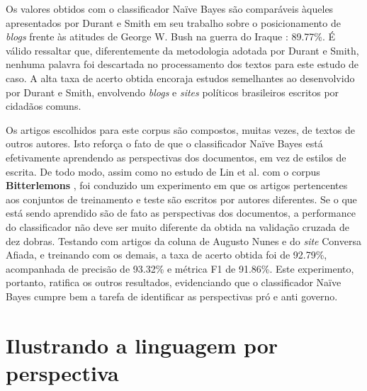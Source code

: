 
Os valores obtidos com o classificador Naïve Bayes são comparáveis àqueles apresentados por Durant e Smith em seu trabalho sobre o posicionamento de \emph{blogs} frente às atitudes de George W. Bush na guerra do Iraque \cite{durant-smith}: 89.77\%. É válido ressaltar que, diferentemente da metodologia adotada por Durant e Smith, nenhuma palavra foi descartada no processamento dos textos para este estudo de caso. A alta taxa de acerto obtida encoraja estudos semelhantes ao desenvolvido por Durant e Smith, envolvendo \emph{blogs} e \emph{sites} políticos brasileiros escritos por cidadãos comuns. %

Os artigos escolhidos para este corpus são compostos, muitas vezes, de textos de outros autores. Isto reforça o fato de que o classificador Naïve Bayes está efetivamente aprendendo as perspectivas dos documentos, em vez de estilos de escrita. De todo modo, assim como no estudo de Lin et al. com o corpus \textbf{Bitterlemons} \cite{lin-et-al2006}, foi conduzido um experimento em que os artigos pertencentes aos conjuntos de treinamento e teste são escritos por autores diferentes. Se o que está sendo aprendido são de fato as perspectivas dos documentos, a performance do classificador não deve ser muito diferente da obtida na validação cruzada de dez dobras. Testando com artigos da coluna de Augusto Nunes e do \emph{site} Conversa Afiada, e treinando com os demais, a taxa de acerto obtida foi de 92.79\%, acompanhada de precisão de 93.32\% e métrica F1 de 91.86\%. Este experimento, portanto, ratifica os outros resultados, evidenciando que o classificador Naïve Bayes cumpre bem a tarefa de identificar as perspectivas pró e anti governo.






\section{Ilustrando a linguagem por perspectiva}

